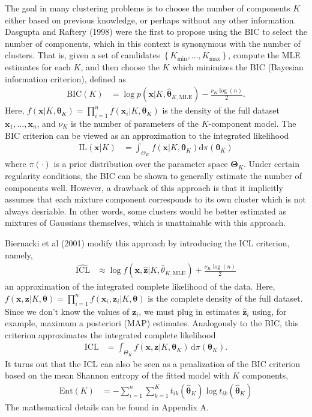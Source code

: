 \documentclass[11pt]{article}
\newcommand*\ba{\[ \begin{aligned}}
\newcommand*\ea{\end{aligned} \]}
\newcommand*\set[1]{\left\{#1\right\}}
\newcommand*\estim[1]{\widehat{#1}}
\newcommand*\der{\text{d}}
\newcommand*\bx{\mathbf{x}}
\newcommand*\bz{\mathbf{z}}
\newcommand*\btheta{\boldsymbol{\theta}}
\newcommand*\bTheta{\boldsymbol{\Theta}}
\renewcommand\;{\,}
\begin{document}
The goal in many clustering problems is to choose the number of components $K$ either based on previous knowledge, or perhaps without any other information.
Dasgupta and Raftery (1998) were the first to propose using the BIC to select the number of components, which in this context is synonymous with the number of clusters. 
That is, given a set of candidates $\set{K_\text{min}, \dotsc, K_\text{max}}$, compute the MLE estimates for each $K$, and then choose the $K$ which minimizes the BIC (Bayesian information criterion), defined as
\ba
\text{BIC}(K) 
	& = \log p(\bx | K, \estim\btheta_{K, \text{MLE}})
		- \frac{ \nu_K \log(n) }{2}.
\ea
Here,
$f(\bx | K, \btheta_K) = \prod_{i = 1}^n f(\bx_i | K, \btheta_K)$ is the density of the full dataset $\bx_1, \dotsc, \bx_n$, and
 $\nu_K$ is the number of parameters of the $K$-component model.
The BIC criterion can be viewed as an approximation to the integrated likelihood
\ba
\text{IL}(\bx | K)
	& = \int_{\Theta_K} f(\bx | K, \btheta_K) \der \pi(\btheta_K)
\ea
where $\pi(\cdot)$ is a prior distribution over the parameter space $\bTheta_K$.
Under certain regularity conditions, the BIC can be shown to generally estimate the number of components well.
However, a drawback of this approach is that it implicitly assumes that each mixture component corresponds to its own cluster which is not always desriable.
In other words, some clusters would be better estimated as mixtures of Gaussians themselves, which is unattainable with this approach. 

Biernacki et al (2001) modify this approach by introducing the ICL criterion, namely,
\ba
\estim{\text{ICL}}
	& \approx 
	\log f(\bx, \estim\bz | K, \estim\theta_{K, \text{MLE}}) + \frac{ \nu_K \log(n) }{2}
\ea
an approximation of the integrated complete likelihood of the data. 
Here, $f(\bx, \bz | K, \btheta) = \prod_{i=1}^n f(\bx_i, \bz_i | K, \btheta)$ is the complete density of the full dataset.
Since we don't know the values of $\bz_i$, we must plug in estimates $\estim\bz_i$ using, for example, maximum a posteriori (MAP) estimates.
Analogously to the BIC, this criterion approximates the integrated complete likelihood
\ba
\text{ICL}
	& = \int_{\Theta_K} f(\bx, \bz | K, \btheta_K) \; \der \pi(\btheta_K).
\ea
It turns out that the ICL can also be seen as a penalization of the BIC criterion based on the mean Shannon entropy of the fitted model with $K$ components, 
\ba
\text{Ent}(K)
	& = - \sum_{i=1}^n \sum_{k = 1}^K t_{ik}(\estim\btheta_K) \log t_{ik}(\estim\btheta_K)
\ea
The mathematical details can be found in Appendix A.
\end{document}
